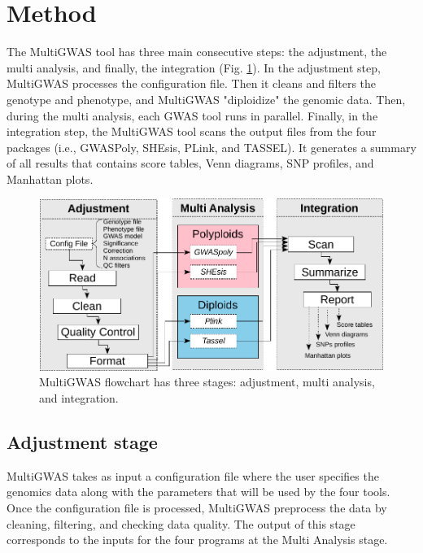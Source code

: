 \section{Method}
The MultiGWAS tool has three main consecutive steps: the adjustment, the multi analysis, and finally, the integration (Fig. \ref{pipeline}). In the adjustment step, MultiGWAS processes the configuration file. Then it cleans and filters the genotype and phenotype, and  MultiGWAS "diploidize" the genomic data. Then, during the multi analysis, each GWAS tool runs in parallel. Finally, in the integration step, the MultiGWAS tool scans the output files from the four packages (i.e., GWASPoly, SHEsis, PLink, and TASSEL). It generates a summary of all results that contains score tables, Venn diagrams, SNP profiles, and Manhattan plots. 

\begin{figure}
\includegraphics[width=12cm]{images/multi-gwas-flowchart-horizontal-stages-config.pdf}
\caption{MultiGWAS flowchart has three stages: adjustment, multi analysis, and integration.\label{pipeline}}

\end{figure}

\subsection{Adjustment stage} 
MultiGWAS takes as input a configuration file where the user specifies the genomics data along with the parameters that will be used by the four tools. Once the configuration file is processed, MultiGWAS preprocess the data by cleaning, filtering, and checking data quality. The output of this stage corresponds to the inputs for the four programs at the Multi Analysis stage.


 
